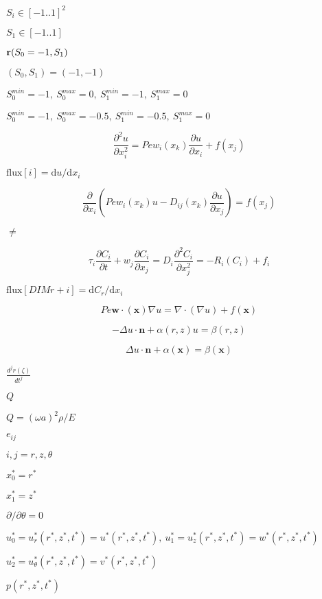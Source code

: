 \documentclass{article}
\begin{document}
$ S_i \in [-1..1]^2 $
\pagebreak

$ S_1\in [-1..1]$
\pagebreak

$ {\bf r}(S_0=-1,S_1) $
\pagebreak

$(S_0,S_1)=(-1,-1)$
\pagebreak

$ S_0^{min}=-1, \ S_0^{max}=0, \ S_1^{min}=-1, \ S_1^{max}=0 $
\pagebreak

$ S_0^{min}=-1, \ S_0^{max}=-0.5, \ S_1^{min}=-0.5, \ S_1^{max}=0 $
\pagebreak

\[ \frac{\partial^2 u}{\partial x_i^2} = Pe w_i(x_k) \frac{\partial u}{\partial x_i} + f(x_j) \]
\pagebreak

$\mbox{flux}[i] = \mbox{d}u / \mbox{d}x_i $
\pagebreak

\[ \frac{\partial}{\partial x_{i}}\left( Pe w_{i}(x_{k}) u - D_{ij}(x_{k})\frac{\partial u}{\partial x_{j}}\right) = f(x_{j}) \]
\pagebreak

$ \ne $
\pagebreak

\[ \tau_{i} \frac{\partial C_{i}}{\partial t} + w_{j} \frac{\partial C_{i}}{\partial x_{j}} = D_{i}\frac{\partial^2 C_{i}}{\partial x_j^2} = - R_{i}(C_{i}) + f_{i} \]
\pagebreak

$\mbox{flux}[DIM r + i] = \mbox{d}C_{r} / \mbox{d}x_i $
\pagebreak

\[ Pe \mathbf{w}\cdot(\mathbf{x}) \nabla u = \nabla \cdot \left( \nabla u \right) + f(\mathbf{x}) \]
\pagebreak

\[ -\Delta u \cdot \mathbf{n} + \alpha(r,z) u = \beta(r,z) \]
\pagebreak

\[ \Delta u \cdot \mathbf{n} + \alpha (\mathbf{x}) = \beta (\mathbf{x}) \]
\pagebreak

$ \frac{d^{j} r(\zeta)}{dt^j} $
\pagebreak

$ Q $
\pagebreak

$ Q = (\omega a)^2 \rho/E $
\pagebreak

$ e_{ij} $
\pagebreak

$ i,j = r,z,\theta $
\pagebreak

$ x_0^* = r^*$
\pagebreak

$ x_1^* = z^* $
\pagebreak

$ \partial / \partial \theta = 0 $
\pagebreak

$ u_0^* = u_r^*(r^*,z^*,t^*) = u^*(r^*,z^*,t^*), \ u_1^* = u_z^*(r^*,z^*,t^*) = w^*(r^*,z^*,t^*)$
\pagebreak

$ u_2^* = u_\theta^*(r^*,z^*,t^*) = v^*(r^*,z^*,t^*) $
\pagebreak

$ p(r^*,z^*,t^*) $
\pagebreak
\end{document}
